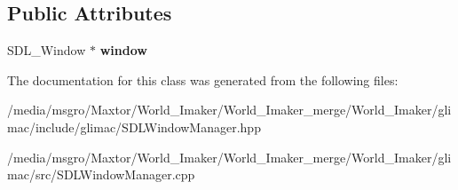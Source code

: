\subsection*{Public Attributes}
\begin{DoxyCompactItemize}
\item 
\mbox{\label{classglimac_1_1SDLWindowManager_a5999492fdc73a660c624015485a8a71e}} 
S\+D\+L\+\_\+\+Window $\ast$ {\bfseries window}
\end{DoxyCompactItemize}


The documentation for this class was generated from the following files\+:\begin{DoxyCompactItemize}
\item 
/media/msgro/\+Maxtor/\+World\+\_\+\+Imaker/\+World\+\_\+\+Imaker\+\_\+merge/\+World\+\_\+\+Imaker/glimac/include/glimac/S\+D\+L\+Window\+Manager.\+hpp\item 
/media/msgro/\+Maxtor/\+World\+\_\+\+Imaker/\+World\+\_\+\+Imaker\+\_\+merge/\+World\+\_\+\+Imaker/glimac/src/S\+D\+L\+Window\+Manager.\+cpp\end{DoxyCompactItemize}
